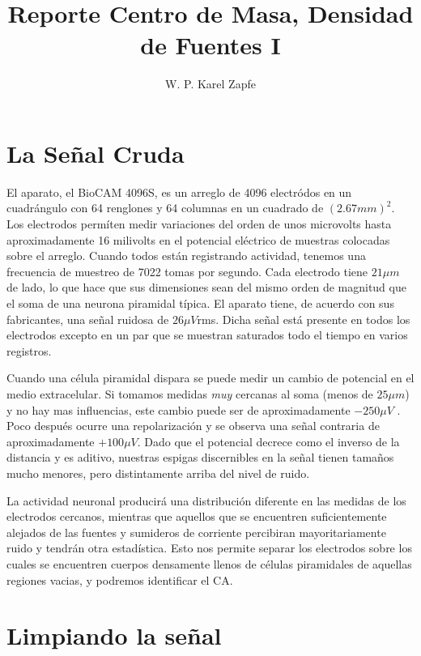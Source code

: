 \documentclass{article}
\title{Reporte Centro de Masa, Densidad de Fuentes I}
\author{W. P. Karel Zapfe}
\begin{document}
\maketitle


\section{La Señal Cruda}

El aparato, el BioCAM 4096S, es un arreglo de 4096 electródos en un 
cuadrángulo con 64 renglones y 64 columnas en un cuadrado de
$(2.67 mm)^2$. Los electrodos permíten medir variaciones del orden
de unos microvolts hasta aproximadamente 16 milivolts 
en el potencial eléctrico de muestras colocadas sobre el arreglo. Cuando
todos están registrando actividad, tenemos una frecuencia de muestreo
de 7022 tomas por segundo. Cada electrodo tiene $21 \mu m$ de lado, lo
que hace que sus dimensiones sean del mismo orden de magnitud que el 
soma de una neurona piramidal típica. El aparato tiene, de acuerdo
con sus fabricantes, una señal ruidosa de $26 \mu V$rms. Dicha señal
está presente en todos los electrodos excepto en un par que se
muestran saturados todo el tiempo en varios registros.

Cuando una célula piramidal dispara se puede medir un cambio de potencial
en el medio extracelular. Si tomamos medidas \emph{muy} cercanas al soma
(menos de $25 \mu m$)
y no hay mas influencias, este cambio puede ser de aproximadamente
$-250\mu V$ \cite{Obien2015}. Poco después ocurre una repolarización
y se observa una señal contraria de aproximadamente $+100\mu V$.
Dado que el potencial decrece como el inverso de la distancia
y es aditivo, nuestras espigas discernibles en la señal tienen tamaños mucho
menores, pero distintamente arriba del nivel de ruido.

La actividad neuronal producirá una distribución diferente en las medidas
de los electrodos cercanos, mientras que aquellos que se encuentren
suficientemente alejados de las fuentes y sumideros de corriente
percibiran mayoritariamente ruido y tendrán otra estadística.
Esto nos permite separar los electrodos sobre los cuales
se encuentren cuerpos densamente llenos de células piramidales
de aquellas regiones vacias, y podremos identificar el CA.



\section{Limpiando la señal}
\end{document}
